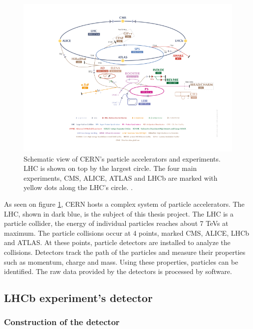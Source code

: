 \documentclass[12pt]{article}
\begin{document}
\begin{figure}[H]
	\includegraphics[width=\textwidth]{accelerator_complex}
	\caption[CERN accelerator complex]{Schematic view of CERN's particle accelerators and experiments. LHC is shown on top by the largest circle. The four main experiments, CMS, ALICE, ATLAS and LHCb are marked with yellow dots along the LHC's circle. \cite{cern_document_server}.}
	\label{fig_accel_complex}
\end{figure}

As seen on figure \ref{fig_accel_complex}, CERN hosts a complex system of particle accelerators\cite{cern_accel_complex}.
The LHC, shown in dark blue, is the subject of this thesis project. The LHC is a particle collider, the energy of individual particles reaches about 7 TeVs at maximum. The particle collisions occur at 4 points, marked CMS, ALICE, LHCb and ATLAS. At these points, particle detectors are installed to analyze the collisions. Detectors track the path of the particles and measure their properties such as momentum, charge and mass. Using these properties, particles can be identified. The raw data provided by the detectors is processed by software.


\subsection{LHCb experiment's detector}\label{sec_lhcb_detector}	

\subsubsection{Construction of the detector}\label{sec_lhcb_det_constr}
\end{document}
